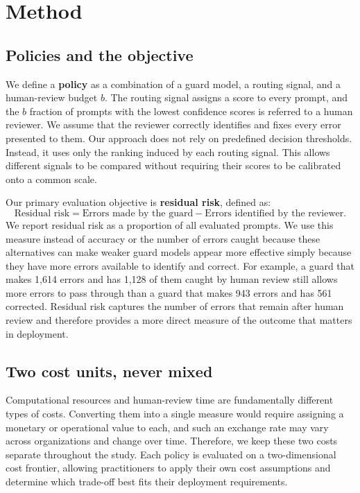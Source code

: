 \documentclass[11pt]{article}
\begin{document}
\section{Method}
\label{sec:method}

\subsection{Policies and the objective}

We define a \textbf{policy} as a combination of a guard model, a routing signal, and a human-review budget $b$. The routing signal assigns a score to every prompt, and the $b$ fraction of prompts with the lowest confidence scores is referred to a human reviewer. We assume that the reviewer correctly identifies and fixes every error presented to them. Our approach does not rely on predefined decision thresholds. Instead, it uses only the ranking induced by each routing signal. This allows different signals to be compared without requiring their scores to be calibrated onto a common scale.

Our primary evaluation objective is \textbf{residual risk}, defined as:
\[
\text{Residual risk} = \text{Errors made by the guard} - \text{Errors identified by the reviewer}.
\]
We report residual risk as a proportion of all evaluated prompts. We use this measure instead of accuracy or the number of errors caught because these alternatives can make weaker guard models appear more effective simply because they have more errors available to identify and correct. For example, a guard that makes 1,614 errors and has 1,128 of them caught by human review still allows more errors to pass through than a guard that makes 943 errors and has 561 corrected. Residual risk captures the number of errors that remain after human review and therefore provides a more direct measure of the outcome that matters in deployment.

\subsection{Two cost units, never mixed}

Computational resources and human-review time are fundamentally different types of costs. Converting them into a single measure would require assigning a monetary or operational value to each, and such an exchange rate may vary across organizations and change over time. Therefore, we keep these two costs separate throughout the study. Each policy is evaluated on a two-dimensional cost frontier, allowing practitioners to apply their own cost assumptions and determine which trade-off best fits their deployment requirements.
\end{document}
